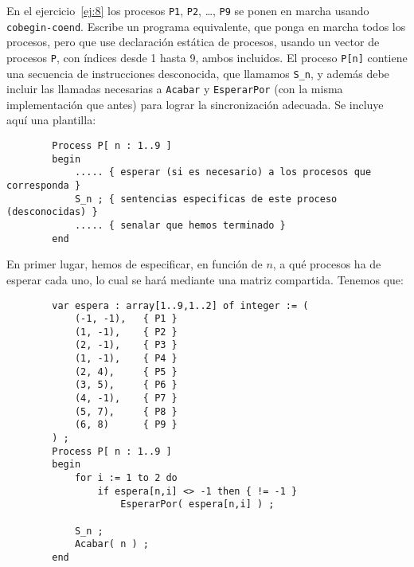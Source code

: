 \begin{ejercicio}
\end{ejercicio}


\begin{ejercicio}
    En el ejercicio~\ref{ej:8} los procesos \verb|P1|, \verb|P2|, \ldots, \verb|P9| se ponen en marcha usando \verb|cobegin-coend|.
    Escribe un programa equivalente, que ponga en marcha todos los procesos, pero que use declaración
    estática de procesos, usando un vector de procesos \verb|P|, con índices desde 1 hasta 9, ambos incluidos. El proceso \verb|P[n]| contiene una secuencia de instrucciones desconocida, que llamamos \verb|S_n|, y además debe incluir las llamadas necesarias a \verb|Acabar| y \verb|EsperarPor| (con la misma implementación que antes) para lograr la sincronización adecuada. Se incluye aquí una plantilla:
    \begin{verbatim}
        Process P[ n : 1..9 ]
        begin
            ..... { esperar (si es necesario) a los procesos que corresponda }
            S_n ; { sentencias especificas de este proceso (desconocidas) }
            ..... { senalar que hemos terminado }
        end
    \end{verbatim}

    En primer lugar, hemos de especificar, en función de $n$, a qué procesos ha de esperar cada uno, lo cual se hará mediante una matriz compartida. Tenemos que:
    \begin{verbatim}
        var espera : array[1..9,1..2] of integer := (
            (-1, -1),   { P1 }
            (1, -1),    { P2 }
            (2, -1),    { P3 }
            (1, -1),    { P4 }
            (2, 4),     { P5 }
            (3, 5),     { P6 }
            (4, -1),    { P7 }
            (5, 7),     { P8 }
            (6, 8)      { P9 }
        ) ;
        Process P[ n : 1..9 ]
        begin
            for i := 1 to 2 do
                if espera[n,i] <> -1 then { != -1 }
                    EsperarPor( espera[n,i] ) ;
            
            S_n ;
            Acabar( n ) ;
        end
    \end{verbatim}
\end{ejercicio}


